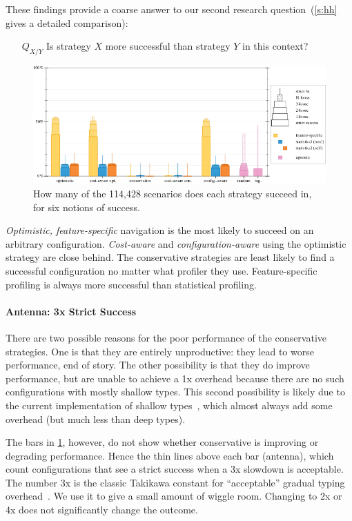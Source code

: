 These findings provide a coarse answer to our second research question~(\cref{s:hh} gives a detailed comparison):

\begin{itemize}
\item[$Q_{X/Y}$] Is strategy $X$ more successful than strategy $Y$ in this
  context?
\end{itemize}

\begin{figure}[ht]
  \includegraphics[width=\columnwidth]{data/strategy-overall-feasible.pdf}
  \caption{How many of the 114,428 scenarios does each strategy succeed in, for six notions of success.}
  \label{f:strategy-overall}
\end{figure}

\emph{Optimistic, feature-specific} navigation is the most likely to
succeed on an arbitrary configuration.
\emph{Cost-aware} and \emph{configuration-aware} using the optimistic strategy
are close behind.
The conservative strategies are least likely to find a successful configuration
no matter what profiler they use.
Feature-specific profiling is always more successful than statistical profiling.

\paragraph{Antenna: 3x Strict Success}
\label{s:antenna}

There are two possible reasons for the poor performance of the conservative
strategies.
One is that they are entirely unproductive: they lead to worse performance, end
of story.
The other possibility is that they do improve performance, but are unable
to achieve a 1x overhead because there are no such configurations with
mostly shallow types.
This second possibility is likely due to the current implementation of shallow
types~\cite{g-deep-shallow}, which almost always add some overhead (but much
less than deep types).

The bars in \cref{f:strategy-overall}, however, do not show whether conservative
is improving or degrading performance.
Hence the thin lines above each bar (antenna), which count configurations that see
a strict success when a 3x slowdown is acceptable.
The number 3x is the classic Takikawa constant for ``acceptable'' gradual typing
overhead~\cite{tfgnvf-popl-2016,vss-popl-2017,bbst-oopsla-2017}.
We use it to give a small amount of wiggle room.
Changing to 2x or 4x does not significantly change the outcome.

